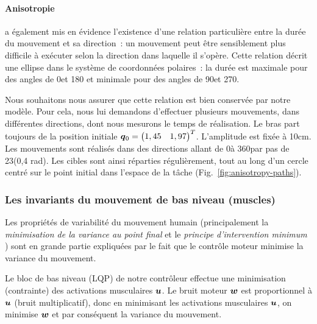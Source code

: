 \documentclass[pdftex,a4paper,11pt]{article}
\begin{document}
\paragraph{Anisotropie}

\cite{gordon94} a également mis en évidence l'existence d'une relation
particulière entre la durée du mouvement et sa direction~:
un mouvement peut être sensiblement plus difficile à exécuter selon la
direction dans laquelle il s'opère.
Cette relation décrit une ellipse dans le système de coordonnées polaires~:
la durée est maximale pour des angles de 0\textdegree et 180\textdegree
et minimale pour des angles de 90\textdegree et 270\textdegree.

Nous souhaitons nous assurer que cette relation est bien conservée par notre
modèle.
Pour cela, nous lui demandons d'effectuer plusieurs mouvements, dans
différentes directions, dont nous mesurons le temps de réalisation.
Le bras part toujours de la position initiale $\boldsymbol{q}{}_0 = \begin{pmatrix} 1,45 &
1,97 \end{pmatrix}^T$. L'amplitude est fixée à 10cm.
Les mouvements sont réalisés dans des directions allant de 0\textdegree à
360\textdegree par pas de 23\textdegree (0,4 rad). Les cibles sont ainsi réparties
régulièrement, tout au long d'un cercle centré sur le point initial dans
l'espace de la tâche (Fig.~\ref{fig:anisotropy-paths}).


\subsubsection{Les invariants du mouvement de bas niveau (muscles)}

Les propriétés de variabilité du mouvement humain (principalement la {\em
minimisation de la variance au point final} \cite{harris98_N} et le {\em
principe d'intervention minimum} \cite{todorov02_NN,todorov03_NIPS})
sont en grande partie expliquées
par le fait que le contrôle moteur minimise la variance du mouvement.

Le bloc de bas niveau (LQP) de notre contrôleur effectue une minimisation
(contrainte) des activations musculaires $\boldsymbol{u}$.  Le bruit moteur $\boldsymbol{w}$ est
proportionnel à $\boldsymbol{u}$ (bruit multiplicatif), donc en minimisant les activations
musculaires $\boldsymbol{u}$, on minimise $\boldsymbol{w}$ et par conséquent la
variance du mouvement.
\end{document}
